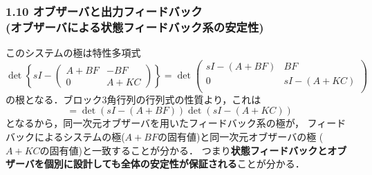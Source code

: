 \documentclass[10pt]{beamer}
\begin{document}
\begin{frame}[t]
\frametitle{1.10 オブザーバと出力フィードバック \\
(オブザーバによる状態フィードバック系の安定性)}
このシステムの極は特性多項式
{\small
\begin{equation}
 \operatorname{det}\left\{s I - \left(\begin{array}{cc}
             A + BF & -BF \\
       0 & A + KC
      \end{array}\right)\right\}
 =
 \operatorname{det}\left(\begin{array}{cc}
            sI - (A + BF) & BF \\
      0 & sI - (A + KC) \\
     \end{array}\right)
\end{equation}
}
の根となる．ブロック3角行列の行列式の性質より，これは
\begin{equation}
 = \operatorname{det}(sI - (A + BF))\operatorname{det}(sI - (A + KC))
\end{equation}
となるから，同一次元オブザーバを用いたフィードバック系の極が，
フィードバックによるシステムの極($A + BF$の固有値)と同一次元オブザーバの極
($A + KC$の固有値)と一致することが分かる．
つまり{\bf 状態フィードバックとオブザーバを個別に設計しても全体の安定性が保証される}ことが分かる．

\end{frame}
\end{document}
